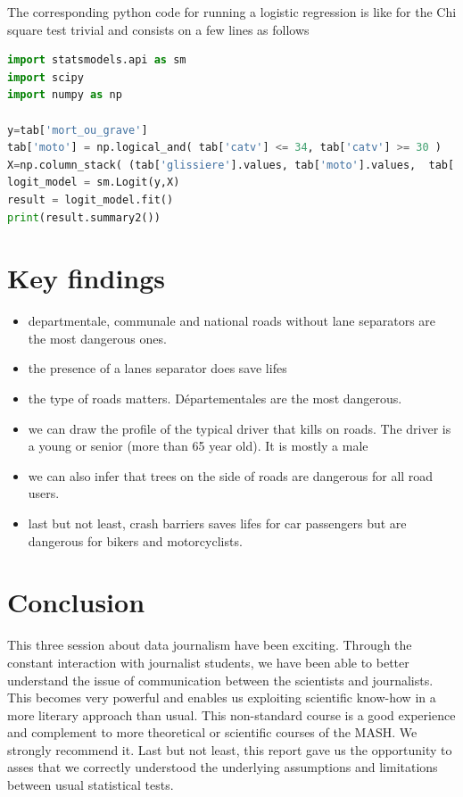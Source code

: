\documentclass[a4paper]{article}
\theoremstyle{definition}
\theoremstyle{proposition}
\begin{document}
The corresponding python code for running a logistic regression is like for the Chi square test trivial and consists on a few lines as follows

\begin{lstlisting}[language=Python]
import statsmodels.api as sm
import scipy 
import numpy as np

y=tab['mort_ou_grave']
tab['moto'] = np.logical_and( tab['catv'] <= 34, tab['catv'] >= 30 )
X=np.column_stack( (tab['glissiere'].values, tab['moto'].values,  tab['moto'].values * tab['glissiere'].values) )
logit_model = sm.Logit(y,X)
result = logit_model.fit()
print(result.summary2())
\end{lstlisting}

\section{Key findings}
\begin{itemize}
\item departmentale, communale and national roads without lane separators are the most dangerous ones.
\item the presence of a lanes separator does save lifes
\item the type of roads matters. Départementales are the most dangerous.
\item we can draw the profile of the typical driver that kills on roads. The driver is a young or senior (more than 65 year old). It is mostly a male
\item we can also infer that trees on the side of roads are dangerous for all road users.
\item last but not least, crash barriers saves lifes for car passengers but are dangerous for bikers and motorcyclists.
\end{itemize}

\section{Conclusion}
This three session about data journalism have been exciting. Through the constant interaction with journalist students, we have been able to better understand the issue of communication between the scientists and journalists. This becomes very powerful and enables us exploiting scientific know-how in a more literary approach than usual. This non-standard course is a good experience and complement to more theoretical or scientific courses of the MASH. We strongly recommend it.
Last but not least, this report gave us the opportunity to asses that we correctly understood the underlying assumptions and limitations between usual statistical tests.
\end{document}
